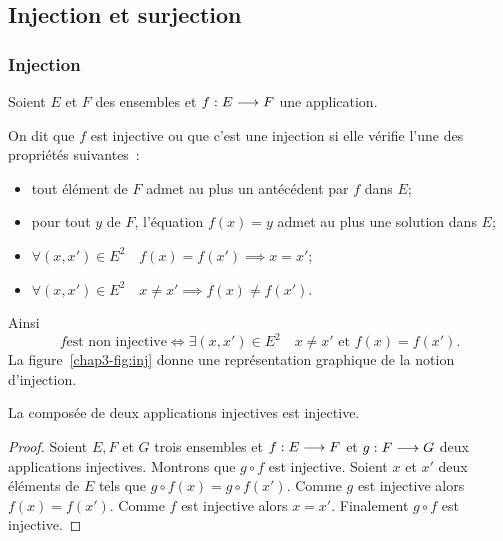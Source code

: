 \subsection{Injection et surjection}\label{chap3-subsec:injetsurj}

\subsubsection{Injection}\label{chap3-subsubsec:injection}

Soient \(E\) et \(F\) des ensembles et \(f:E \longrightarrow{} F\) une application.
\begin{defdef}
  On dit que \(f\) est injective ou que c'est une injection si elle vérifie l'une
  des propriétés suivantes~:
  \begin{itemize}
    \item tout élément de \(F\) admet au plus un antécédent par \(f\) dans \(E\);
    \item pour tout \(y\) de \(F\), l'équation \(f(x) = y\) admet au plus une
      solution dans \(E\);
    \item \(\forall{}(x,x') \in{}E^2 \quad f(x) = f(x') \implies x = x'\);
    \item \(\forall{}(x,x') \in{}E^2 \quad  x \neq{}x' \implies f(x) \neq{}f(x')\).
  \end{itemize}
  Ainsi
  \begin{equation}
    f \text{est non injective} \iff{}\exists{} (x,x') \in{}E^2 \quad x \neq{}x'
    \text{~et~} f(x) = f(x').
  \end{equation}
  La figure~\ref{chap3-fig:inj} donne une représentation graphique de la notion
  d'injection.
\end{defdef}

\begin{theo}
  La composée de deux applications injectives est injective.
\end{theo}

\begin{proof}
  Soient \(E,F\) et \(G\) trois ensembles et \(f:E \longrightarrow{} F\) et
  \(g:F \longrightarrow{} G\) deux applications injectives. Montrons que \(g \circ f\)
  est injective.
  Soient \(x\) et \(x'\) deux éléments de \(E\) tels que \(g \circ f(x) = g \circ
  f(x')\). Comme \(g\) est injective alors \(f(x) = f(x')\). Comme \(f\) est
  injective alors \(x = x'\). Finalement \(g \circ f\) est injective.
\end{proof}

